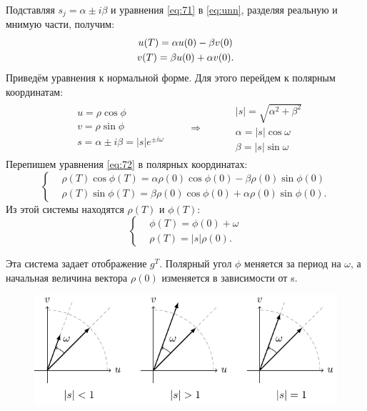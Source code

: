 Подставляя $s_j=\alpha \pm i\beta$ и уравнения \eqref{eq:71} в \eqref{eq:unn}, разделяя реальную и мнимую части, получим:
\begin{gather}
	u(T)=\alpha u(0)- \beta v(0) \notag \\ 
	v(T)=\beta u(0)+ \alpha v(0).		
	\label{eq:72}
\end{gather}
Приведём уравнения к нормальной форме. Для этого перейдем к полярным координатам:
\begin{gather}
	\begin{aligned}
		&u=\rho \cos{\phi}\\
		&v=\rho \sin{\phi}\\
		&s=\alpha \pm i\beta=|s|e^{\pm i \omega}
	\end{aligned}\qquad\Rightarrow\qquad
	\begin{aligned}
	 	&|s|=\sqrt{\alpha^2+\beta^2}\\
	 	&\alpha=|s|\cos{\omega}\\
	 	&\beta=|s|\sin{\omega}
	 \end{aligned} 		
	 \label{eq:73}
\end{gather}
Перепишем уравнения \eqref{eq:72} в полярных координатах:
\begin{equation}
	\left\{\begin{aligned}
		&\rho(T)\cos{\phi(T)}=\alpha \rho(0)\cos{\phi(0)}-\beta \rho(0)\sin{\phi(0)} \\
		&\rho(T)\sin{\phi(T)}=\beta \rho(0)\cos{\phi(0)}+\alpha \rho(0)\sin{\phi(0)}.
	\end{aligned}\right.
	\label{eq:74}
\end{equation}
Из этой системы находятся $\rho(T)$ и $\phi(T)$:
\begin{equation}
	\left\{\begin{aligned}
		&\phi(T)=\phi(0)+\omega \\
		&\rho(T)=|s|\rho(0).
	\end{aligned}\right.
	\label{eq:75}
\end{equation}

Эта система задает отображение $g^T$. Полярный угол $\phi$ меняется за период на $\omega$, а начальная величина вектора $\rho(0)$ изменяется в зависимости от s. 

\begin{figure}[H]
	\centering 
	\includegraphics[scale=1.5]{img/parametric_oscillations/sj_vu} 
\end{figure}

